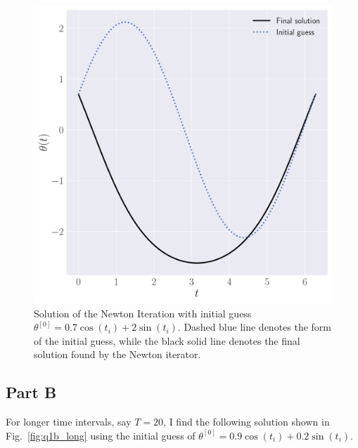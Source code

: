 \documentclass[12pt]{article}
\begin{document}
\begin{figure}[!h]
	\centering
	\includegraphics[clip, scale=0.3]{q1a_alt_guess_figure.pdf}
	\caption{Solution of the Newton Iteration with initial guess $\theta^{[0]}=0.7\cos(t_{i})+2\sin(t_{i})$. Dashed blue line denotes the 
	form of the initial guess, while the black solid line denotes the final solution found by the Newton iterator.}
	\label{fig:q1_alt_guess_plot}
\end{figure}

\subsection*{Part B}
For longer time intervals, say $T = 20$, I find the following solution shown in Fig.~\ref{fig:q1b_long} using the initial guess of $\theta^{[0]}=0.9\cos(t_{i})+0.2\sin(t_{i})$.
\end{document}
